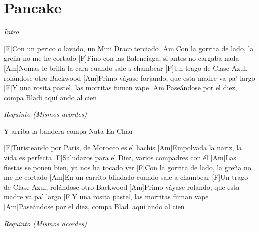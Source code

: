 \section{Pancake}

\noindent
\vspace{1cm}

\begin{guitar}
	\begin{multicols}{2}

		\textit{Intro } 

		[F]Con un perico o lavado, un Mini Draco terciado
		[Am]Con la gorrita de lado, la greña no me he cortado
		[F]Fino con las Balenciaga, si antes no cargaba nada
		[Am]Nomas le brilla la cara cuando sale a chambear
		[F]Un trago de Clase Azul, rolándose otro Backwood
		[Am]Primo váyase forjando, que esta madre va pa' largo
		[F]Y una rosita pastel, las morritas fuman vape
		[Am]Paseándose por el diez, compa Bladi aquí ando al cien

		\textit{Requinto (Mismos acordes)}

		Y arriba la bandera compa Nata
		Ea
		Chau

		[F]Turisteando por Paris, de Morocco es el hachis
		[Am]Empolvada la nariz, la vida es perfecta
		[F]Saludazos para el Diez, varios compadres con él
		[Am]Las fiestas se ponen bien, ya nos ha tocado ver
		[F]Con la gorrita de lado, la greña no me he cortado
		[Am]En un carrito blindado cuando sale a chambear
		[F]Un trago de Clase Azul, rolándose otro Backwood
		[Am]Primo váyase rolando, que esta madre va pa' largo
		[F]Y una rosita pastel, las morritas fuman vape
		[Am]Paseándose por el diez, compa Bladi aquí ando al cien

		\textit{Requinto (Mismos acordes)}
	\end{multicols}
\end{guitar}
